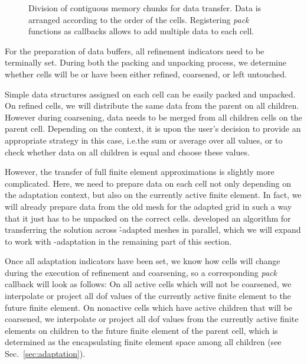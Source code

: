 \begin{figure}
\centering

\caption[Division of contiguous memory chunks for data transfer.]{Division of contiguous memory chunks for data transfer. Data is arranged according to the order of the cells. Registering \textit{pack} functions as callbacks allows to add multiple data to each cell.}
\label{fig:memory}
\end{figure}

For the preparation of data buffers, all refinement indicators need to be terminally set. During both the packing and unpacking process, we determine whether cells will be or have been either refined, coarsened, or left untouched.

Simple data structures assigned on each cell can be easily packed and unpacked. On refined cells, we will distribute the same data from the parent on all children. However during coarsening, data needs to be merged from all children cells on the parent cell. Depending on the context, it is upon the user's decision to provide an appropriate strategy in this case, i.e.\@ the sum or average over all values, or to check whether data on all children is equal and choose these values.

However, the transfer of full finite element approximations is slightly more complicated. Here, we need to prepare data on each cell not only depending on the adaptation context, but also on the currently active finite element. In fact, we will already prepare data from the old mesh for the adapted grid in such a way that it just has to be unpacked on the correct cells. \textcite{bangerth2012} developed an algorithm for transferring the solution across \h-adapted meshes in parallel, which we will expand to work with \hp-adaptation in the remaining part of this section.

Once all adaptation indicators have been set, we know how cells will change during the execution of refinement and coarsening, so a corresponding \textit{pack} callback will look as follows: On all active cells which will not be coarsened, we interpolate or project all \gls{dof} values of the currently active finite element to the future finite element. On nonactive cells which have active children that will be coarsened, we interpolate or project all \gls{dof} values from the currently active finite elements on children to the future finite element of the parent cell, which is determined as the encapsulating finite element space among all children (see Sec.~\ref{sec:adaptation}).


